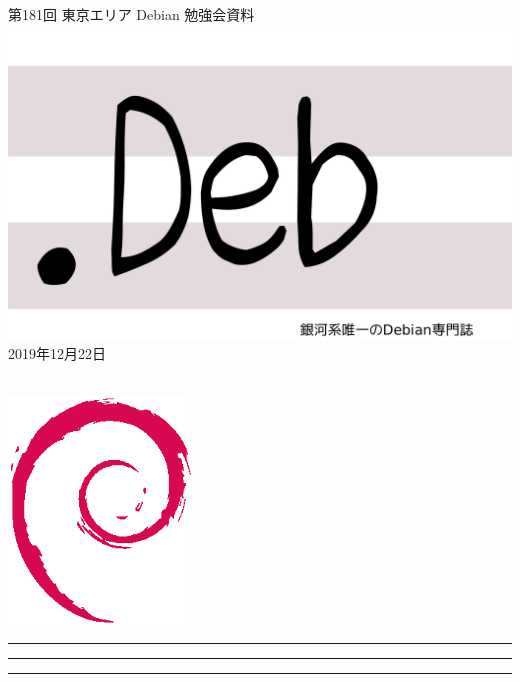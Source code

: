 \documentclass[mingoth,a4paper]{jsarticle}
\newcommand{\debmtgyear}{2019}
\newcommand{\debmtgmonth}{12}
\newcommand{\debmtgdate}{22}
\newcommand{\debmtgnumber}{181}
\begin{document}
\begin{titlepage}
\thispagestyle{empty}

\vspace*{-2cm}
第\debmtgnumber{}回 東京エリア Debian 勉強会資料\\
\hspace*{-2cm}
\includegraphics{image2012-natsu/dotdeb.pdf}\\
\hfill{}\debmtgyear{}年\debmtgmonth{}月\debmtgdate{}日

\\

\vspace*{-2cm}
\hfill{}\includegraphics[height=6cm]{image200502/openlogo-nd.eps}
\end{titlepage}

\newpage

\begin{minipage}[b]{0.2\hsize}
 \colorbox{titleback}{}
\end{minipage}
\begin{minipage}[b]{0.8\hsize}
\hrule
\vspace{2mm}
\hrule
\begin{multicols}{2}
\tableofcontents
\end{multicols}
\vspace{2mm}
\hrule
\end{minipage}
\end{document}
